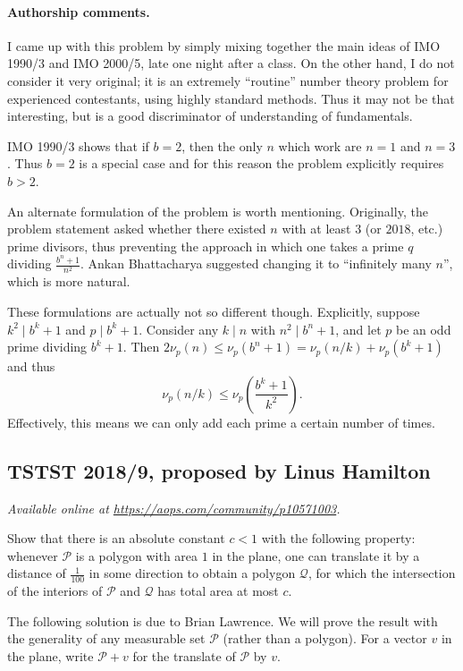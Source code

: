 \documentclass[11pt]{scrartcl}
\begin{document}
\paragraph{Authorship comments.}
I came up with this problem by simply
mixing together the main ideas of IMO 1990/3 and IMO 2000/5,
late one night after a class.
On the other hand, I do not consider it very original;
it is an extremely ``routine'' number theory problem
for experienced contestants, using highly standard methods.
Thus it may not be that interesting,
but is a good discriminator of understanding of fundamentals.

IMO 1990/3 shows that if $b=2$,
then the only $n$ which work are $n=1$ and $n=3$.
Thus $b = 2$ is a special case
and for this reason the problem explicitly requires $b > 2$.

An alternate formulation of the problem is worth mentioning.
Originally, the problem statement asked whether there existed
$n$ with at least $3$ (or $2018$, etc.) prime divisors,
thus preventing the approach in which one takes
a prime $q$ dividing $\frac{b^n+1}{n^2}$.
Ankan Bhattacharya suggested changing it to ``infinitely many $n$'',
which is more natural.

These formulations are actually not so different though.
Explicitly, suppose $k^2 \mid b^{k}+1$ and $p \mid b^k+1$.
Consider any $k \mid n$ with $n^2 \mid b^n+1$,
and let $p$ be an odd prime dividing $b^k+1$.
Then $2\nu_p(n) \le \nu_p(b^n+1) = \nu_p(n/k) + \nu_p(b^k+1)$
and thus
\[ \nu_p(n/k) \le \nu_p\left( \frac{b^k+1}{k^2} \right). \]
Effectively, this means we can only add each prime a certain number of times.
\pagebreak

\subsection{TSTST 2018/9, proposed by Linus Hamilton}
\textsl{Available online at \url{https://aops.com/community/p10571003}.}
\begin{mdframed}[style=mdpurplebox,frametitle={Problem statement}]
Show that there is an absolute constant $c < 1$
with the following property:
whenever $\mathcal P$ is a polygon with area $1$ in the plane,
one can translate it by a distance of $\frac{1}{100}$ in some direction
to obtain a polygon $\mathcal Q$, for which
the intersection of the interiors of $\mathcal P$ and $\mathcal Q$
has total area at most $c$.
\end{mdframed}
The following solution is due to Brian Lawrence.
We will prove the result with the generality
of any measurable set $\mathcal{P}$ (rather than a polygon).
For a vector $v$ in the plane,
write $\mathcal{P} + v$ for the translate of $\mathcal{P}$ by $v$.
\end{document}
